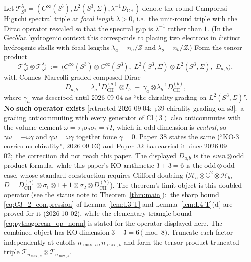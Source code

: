 \documentclass[11pt,a4paper]{article}
\theoremstyle{plain}
\theoremstyle{definition}
\newcommand{\nmaxa}{n_{\max,a}}
\newcommand{\nmaxb}{n_{\max,b}}
\newcommand{\sthree}{S^{3}}
\newcommand{\Hilb}{\mathcal{H}}
\newcommand{\Tcal}{\mathcal{T}}
\newcommand{\C}{\mathbb{C}}
\newcommand{\DCH}{D_{\mathrm{CH}}}
\begin{document}
Let $\Tcal_{\sthree}^{\lambda} = (C^\infty(\sthree),
L^2(\sthree, \Sigma), \lambda^{-1} \DCH)$ denote the round
Camporesi--Higuchi spectral triple at \emph{focal length} $\lambda > 0$,
i.e.\ the unit-round triple with the Dirac operator rescaled so that
the spectral gap is $\lambda^{-1}$ rather than $1$. (In the GeoVac
hydrogenic context this corresponds to placing two electrons in
distinct hydrogenic shells with focal lengths $\lambda_a = n_a / Z$ and
$\lambda_b = n_b / Z$.) Form the tensor product
\begin{equation}\label{eq:tensor_triple}
   \Tcal_{\sthree}^{\lambda_a} \otimes \Tcal_{\sthree}^{\lambda_b}
   \;:=\; \bigl(C^\infty(\sthree) \otimes C^\infty(\sthree),\;
          L^2(\sthree, \Sigma) \otimes L^2(\sthree, \Sigma),\;
          D_{a,b} \bigr),
\end{equation}
with Connes--Marcolli graded composed Dirac
\begin{equation}\label{eq:CM_dirac}
   D_{a,b} \;=\; \lambda_a^{-1} \DCH^{(a)} \otimes I_b
                \;+\; \gamma_a \otimes \lambda_b^{-1} \DCH^{(b)},
\end{equation}
where $\gamma_a$ was described until 2026-09-04 as ``the chirality grading
on $L^2(\sthree, \Sigma)$''. \textbf{No such operator exists} [retracted 2026-09-04: p39-chirality-grading-on-s3]:\
a grading anticommuting with every generator of $\mathrm{Cl}(3)$ also
anticommutes with the volume element
$\omega = \sigma_1\sigma_2\sigma_3 = i\,I$, which in odd dimension is
\emph{central}, so $\gamma\omega = -\omega\gamma$ and $\gamma\omega =
\omega\gamma$ together force $\gamma = 0$. Paper~38 states the same
(``KO-$3$ carries no chirality'', 2026-09-03) and Paper~32 has carried it
since 2026-09-02;\ the correction did not reach this paper. The displayed
$D_{a,b}$ is the \emph{even}\,$\otimes$\,odd product formula, while this
paper's KO arithmetic $3+3=6$ is the odd\,$\otimes$\,odd case, whose standard
construction requires Clifford doubling
($\Hilb_a \otimes \C^2 \otimes \Hilb_b$,
$D = \DCH^{(a)}\otimes\sigma_1\otimes 1 + 1\otimes\sigma_2\otimes\DCH^{(b)}$).
The theorem's limit object is this doubled operator (see the status note
to Theorem~\ref{thm:main});\ the sharp bound \eqref{eq:C3_2_compression} of
Lemma~\ref{lem:L3-T} and Lemma~\ref{lem:L4-T}(d) are proved for it
(2026-10-02), while the elementary triangle bound
\eqref{eq:pythagorean_op_norm} is stated for the operator displayed here.
The combined object has KO-dimension $3 + 3 = 6 \pmod 8$. Truncate
each factor independently at cutoffs $\nmaxa, \nmaxb$ and form the
tensor-product truncated triple $\Tcal_{\nmaxa} \otimes \Tcal_{\nmaxb}$.
\end{document}
